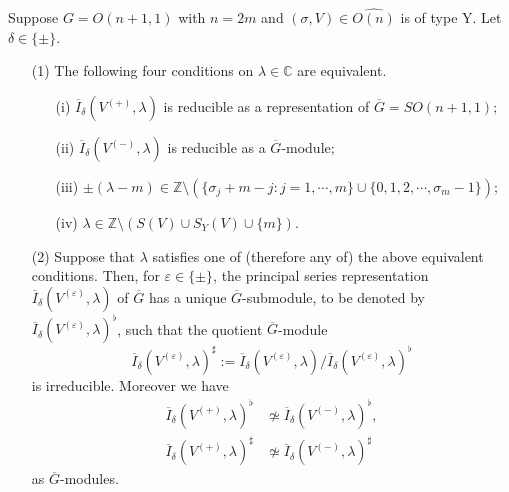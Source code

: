 \begin{proposition}
\label{prop:irrIVpm}
Suppose $G=O(n+1,1)$ with $n=2m$
 and $(\sigma,V) \in \widehat {O(n)}$ is of type Y.  
Let $\delta \in \{\pm\}$.  
\begin{enumerate}
\item[{\rm{(1)}}]
The following four conditions on $\lambda  \in {\mathbb{C}}$ 
 are equivalent.  
\begin{enumerate}
\item[{\rm{(i)}}]
$\overline I_{\delta}(V^{(+)},\lambda)$ is reducible
 as a representation 
 of $\overline G=SO(n+1,1);$
\item[{\rm{(ii)}}]
$\overline I_{\delta}(V^{(-)},\lambda)$ is reducible
 as a $\overline G$-module$;$
\item[{\rm{(iii)}}]
$\pm(\lambda-m)\in {\mathbb{Z}}
 \setminus 
 (\{\sigma_j+m-j:j=1,\cdots,m\} \cup \{0,1,2,\cdots,\sigma_m-1\});$
\item[{\rm{(iv)}}]
$\lambda \in {\mathbb{Z}} \setminus
(S(V) \cup S_Y(V) \cup \{m\})$.  
\end{enumerate}
\item[{\rm{(2)}}]
Suppose that $\lambda$ satisfies
 one of (therefore any of)
 the above equivalent conditions.  
Then, 
 for $\varepsilon \in \{\pm\}$, 
 the principal series representation
 $\overline I_{\delta}(V^{(\varepsilon)}, \lambda)$ of $\overline G$
 has a unique $\overline G$-submodule, 
 to be denoted by $\overline I_{\delta}(V^{(\varepsilon)}, \lambda)^{\flat}$, 
 such that the quotient $\overline G$-module
\[
   \overline I_{\delta}(V^{(\varepsilon)}, \lambda)^{\sharp}
  :=\overline I_{\delta}(V^{(\varepsilon)}, \lambda)
   /\overline I_{\delta}(V^{(\varepsilon)}, \lambda)^{\flat}
\]
 is irreducible.  
Moreover we have
\begin{align*}
   \overline I_{\delta}(V^{(+)}, \lambda)^{\flat}
 &\not\simeq 
 \overline I_{\delta}(V^{(-)}, \lambda)^{\flat}, 
\\
  \overline I_{\delta}(V^{(+)}, \lambda)^{\sharp}
  &\not\simeq 
  \overline I_{\delta}(V^{(-)}, \lambda)^{\sharp}
\end{align*}
as $\overline G$-modules.  
\end{enumerate}
\end{proposition}

